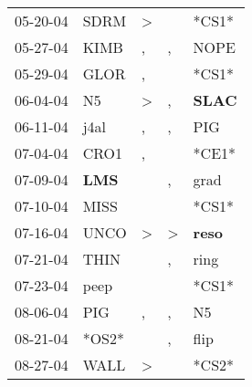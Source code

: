 \begin{supertabular}{p{0.07\textwidth}p{0.06\textwidth}p{0.02\textwidth}p{0.02\textwidth}p{0.06\textwidth}}
          05-20-04\textsuperscript{} &           SDRM\textsuperscript{} &     \textgreater &                  &                            *CS1* \\
          05-27-04\textsuperscript{} &           KIMB\textsuperscript{} &                , &                , &           NOPE\textsuperscript{} \\
          05-29-04\textsuperscript{} &           GLOR\textsuperscript{} &                , &                  &                            *CS1* \\
          06-04-04\textsuperscript{} &             N5\textsuperscript{} &     \textgreater &                , &  \textbf{SLAC\textsuperscript{}} \\
          06-11-04\textsuperscript{} &           j4al\textsuperscript{} &                , &                , &            PIG\textsuperscript{} \\
          07-04-04\textsuperscript{} &           CRO1\textsuperscript{} &                , &                  &                            *CE1* \\
          07-09-04\textsuperscript{} &   \textbf{LMS\textsuperscript{}} &                  &                , &           grad\textsuperscript{} \\
          07-10-04\textsuperscript{} &           MISS\textsuperscript{} &                  &                  &                            *CS1* \\
          07-16-04\textsuperscript{} &           UNCO\textsuperscript{} &     \textgreater &     \textgreater &  \textbf{reso\textsuperscript{}} \\
          07-21-04\textsuperscript{} &           THIN\textsuperscript{} &                  &                , &           ring\textsuperscript{} \\
          07-23-04\textsuperscript{} &           peep\textsuperscript{} &                  &                  &                            *CS1* \\
          08-06-04\textsuperscript{} &            PIG\textsuperscript{} &                , &                , &             N5\textsuperscript{} \\
          08-21-04\textsuperscript{} &                            *OS2* &                  &                , &           flip\textsuperscript{} \\
          08-27-04\textsuperscript{} &           WALL\textsuperscript{} &     \textgreater &                  &                            *CS2* \\

\end{supertabular}
